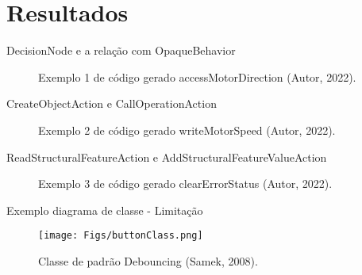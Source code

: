 \documentclass[handout,aspectratio = 169]{beamer}
\begin{document}
\section{Resultados}
\begin{frame}{DecisionNode e a relação com OpaqueBehavior}

\begin{figure}[htbp]
\centering
{} %
\quad %
\caption{Exemplo 1 de código gerado accessMotorDirection (Autor, 2022).}
\end{figure}

\end{frame}

\begin{frame}{CreateObjectAction e CallOperationAction}

\begin{figure}[htbp]
\centering
{} %
\quad %
\caption{Exemplo 2 de código gerado writeMotorSpeed (Autor, 2022).}
\end{figure}

\end{frame}

\begin{frame}{ReadStructuralFeatureAction e AddStructuralFeatureValueAction}

\begin{figure}[htbp]
\centering
{} %
\quad %
\caption{Exemplo 3 de código gerado clearErrorStatus (Autor, 2022).}
\end{figure}

\end{frame}

\begin{frame}{Exemplo diagrama de classe - Limitação}
    \begin{figure}
            \centering
             \texttt{[image: Figs/buttonClass.png]}
            \caption{Classe de padrão Debouncing (Samek, 2008).}
        \end{figure}
\end{frame}
\end{document}

